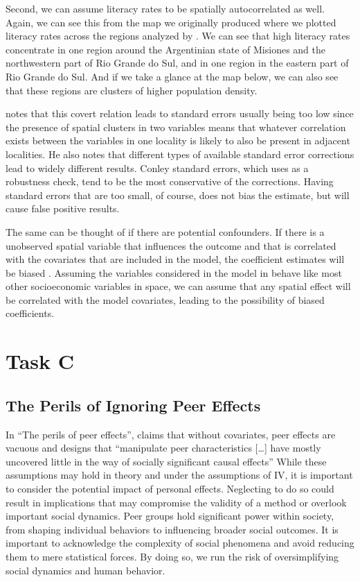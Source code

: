 \documentclass[
  a4paper,
]{article}
\begin{document}
Second, we can assume literacy rates to be spatially autocorrelated as
well. Again, we can see this from the map we originally produced where
we plotted literacy rates across the regions analyzed by
\textcite{valencia2019}. We can see that high literacy rates concentrate
in one region around the Argentinian state of Misiones and the
northwestern part of Rio Grande do Sul, and in one region in the eastern
part of Rio Grande do Sul. And if we take a glance at the map below, we
can also see that these regions are clusters of higher population
density.

\textcite{kelly2021} notes that this covert relation leads to standard
errors usually being too low since the presence of spatial clusters in
two variables means that whatever correlation exists between the
variables in one locality is likely to also be present in adjacent
localities. He also notes that different types of available standard
error corrections lead to widely different results. Conley standard
errors, which \textcite{valencia2019} uses as a robustness check, tend
to be the most conservative of the corrections. Having standard errors
that are too small, of course, does not bias the estimate, but will
cause false positive results.

The same can be thought of if there are potential confounders. If there
is a unobserved spatial variable that influences the outcome and that is
correlated with the covariates that are included in the model, the
coefficient estimates will be biased \parencite{dupont2023}. Assuming
the variables considered in the model in \textcite{valencia2019} behave
like most other socioeconomic variables in space, we can assume that any
spatial effect will be correlated with the model covariates, leading to
the possibility of biased coefficients.

\newpage

\section{Task C}\label{task-c}

\subsection{The Perils of Ignoring Peer
Effects}\label{the-perils-of-ignoring-peer-effects}

In ``The perils of peer effects'', \textcite{angrist2014} claims that
without covariates, peer effects are vacuous and designs that
``manipulate peer characteristics {[}\ldots{]} have mostly uncovered
little in the way of socially significant causal effects''
\parencite{angrist2014} While these assumptions may hold in theory and
under the assumptions of IV, it is important to consider the potential
impact of personal effects. Neglecting to do so could result in
implications that may compromise the validity of a method or overlook
important social dynamics. Peer groups hold significant power within
society, from shaping individual behaviors to influencing broader social
outcomes. It is important to acknowledge the complexity of social
phenomena and avoid reducing them to mere statistical forces. By doing
so, we run the risk of oversimplifying social dynamics and human
behavior.
\end{document}
